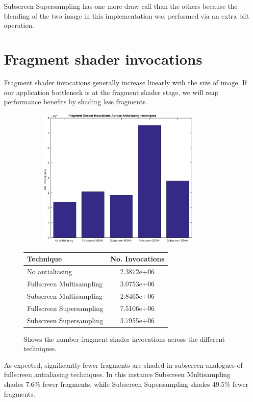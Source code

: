 \documentclass[12pt,a4paper,twoside,openright]{report}
\begin{document}
Subscreen Supersampling has one more draw call than the others because the blending of the two image in this implementation was performed via an extra blit operation.

\section{Fragment shader invocations}

Fragment shader invocations generally increase linearly with the size of image. If our application bottleneck is at the fragment shader stage, we will reap performance benefits by shading less fragments.

\begin{figure}[tbh]

 
\begin{subfigure}{0.5\textwidth}
\includegraphics[height=7cm]{figs/fsInvocations.eps}
\end{subfigure}
\qquad
\begin{tabular}{l|c}
Technique   & No. Invocations \\ 
\hline
No antialiasing      & 2.3872e+06 \\
Fullscreen Multisampling     & 3.0753e+06 \\
Subscreen Multisampling    &  2.8465e+06  \\
Fullscreen Supersampling      &  7.5106e+06   \\
Subscreen Supersampling    &  3.7955e+06  \\
\end{tabular}
 
\caption{Shows the number fragment shader invocations across the different techniques.}
\end{figure}

As expected, significantly fewer fragments are shaded in subscreen analogues of fullscreen antialiasing techniques. In this instance Subscreen Multisampling shades 7.6\% fewer fragments, while Subscreen Supersampling shades 49.5\% fewer fragments.
\end{document}
